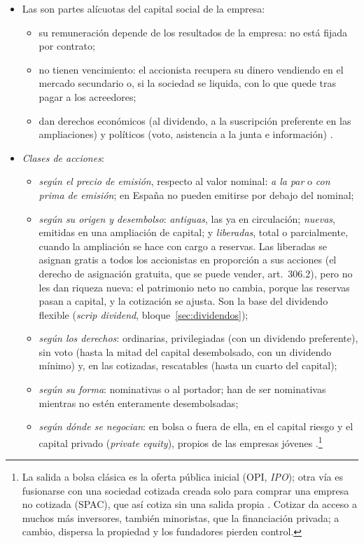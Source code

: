\documentclass[11pt]{article}
\begin{document}
\begin{itemize}
\item Las  son partes alícuotas del capital social de la empresa:
  \begin{itemize}
  \item su remuneración depende de los resultados de la empresa: no está fijada por contrato;
  \item no tienen vencimiento: el accionista recupera su dinero vendiendo en el mercado secundario o, si la sociedad se liquida, con lo que quede tras pagar a los acreedores;
  \item dan derechos económicos (al dividendo, a la suscripción preferente en las ampliaciones) y políticos (voto, asistencia a la junta e información) .
  \end{itemize}
\item \emph{Clases de acciones}:
  \begin{itemize}
  \item \emph{según el precio de emisión}, respecto al valor nominal: \emph{a la par} o \emph{con prima de emisión}; en España no pueden emitirse por debajo del nominal\nocite{LSC2010};
  \item \emph{según su origen y desembolso}: \emph{antiguas}, las ya en circulación; \emph{nuevas}, emitidas en una ampliación de capital; y \emph{liberadas}, total o parcialmente, cuando la ampliación se hace con cargo a reservas\nocite{LSC2010}. Las liberadas se asignan gratis a todos los accionistas en proporción a sus acciones (el derecho de asignación gratuita, que se puede vender, art.~306.2), pero no les dan riqueza nueva: el patrimonio neto no cambia, porque las reservas pasan a capital, y la cotización se ajusta. Son la base del dividendo flexible (\emph{scrip dividend}, bloque~\ref{sec:dividendos});
  \item \emph{según los derechos}: ordinarias, privilegiadas (con un dividendo preferente), sin voto (hasta la mitad del capital desembolsado, con un dividendo mínimo) y, en las cotizadas, rescatables (hasta un cuarto del capital)\nocite{LSC2010};
  \item \emph{según su forma}: nominativas o al portador; han de ser nominativas mientras no estén enteramente desembolsadas\nocite{LSC2010};
  \item \emph{según dónde se negocian}: en bolsa o fuera de ella, en el capital riesgo y el capital privado (\emph{private equity}), propios de las empresas jóvenes .\footnote{La salida a bolsa clásica es la oferta pública inicial (OPI, \emph{IPO}); otra vía es fusionarse con una sociedad cotizada creada solo para comprar una empresa no cotizada (SPAC), que así cotiza sin una salida propia . Cotizar da acceso a muchos más inversores, también minoristas, que la financiación privada; a cambio, dispersa la propiedad y los fundadores pierden control.}
  \end{itemize}
\end{itemize}
\end{document}
